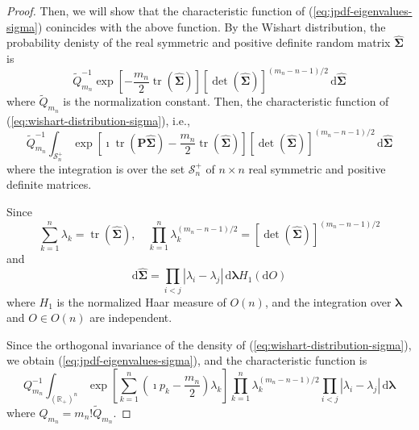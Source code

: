 \begin{proof}
    Then, we will show that the characteristic function of (\ref{eq:jpdf-eigenvalues-sigma}) conincides with the above function. By the Wishart distribution, the probability denisty of the real symmetric and positive definite random matrix $\widehat{\boldsymbol{\Sigma}}$ is
    \begin{equation}
        \widetilde{Q}_{m_{n}}^{-1}\exp\left[-\frac{m_{n}}{2}\operatorname{tr}\left(\widehat{\boldsymbol{\Sigma}}\right)\right]\left[\operatorname{det}\left(\widehat{\boldsymbol{\Sigma}}\right)\right]^{(m_{n}-n-1)/2}\,\mathrm{d}\widehat{\boldsymbol{\Sigma}}
        \label{eq:wishart-distribution-sigma}
    \end{equation}
    where $\widetilde{Q}_{m_{n}}$ is the normalization constant. Then, the characteristic function of (\ref{eq:wishart-distribution-sigma}), i.e.,
    \begin{equation*}
        \widetilde{Q}_{m_{n}}^{-1}\int_{\mathcal{S}_{n}^{+}}\exp\left[\imath\operatorname{tr}\left(\mathbf{P}\widehat{\boldsymbol{\Sigma}}\right)-\frac{m_{n}}{2}\operatorname{tr}\left(\widehat{\boldsymbol{\Sigma}}\right)\right]\left[\operatorname{det}\left(\widehat{\boldsymbol{\Sigma}}\right)\right]^{(m_{n}-n-1)/2}\,\mathrm{d}\widehat{\boldsymbol{\Sigma}}
    \end{equation*}
    where the integration is over the set $\mathcal{S}_{n}^{+}$ of $n\times n$ real symmetric and positive definite matrices.

    Since
    \begin{equation*}
        \sum_{k=1}^{n}\lambda_{k}=\operatorname{tr}\left(\widehat{\boldsymbol{\Sigma}}\right),\quad\prod_{k=1}^{n}\lambda_{k}^{(m_{n}-n-1)/2}=\left[\operatorname{det}\left(\widehat{\boldsymbol{\Sigma}}\right)\right]^{(m_{n}-n-1)/2}
    \end{equation*}
    and
    \begin{equation*}
        \mathrm{d}\widehat{\boldsymbol{\Sigma}}=\prod_{i<j}\left|\lambda_{i}-\lambda_{j}\right|\,\mathrm{d}\boldsymbol{\lambda}H_{1}\left(\mathrm{d}O\right)
    \end{equation*}
    where $H_{1}$ is the normalized Haar measure of $O(n)$, and the integration over $\boldsymbol{\lambda}$ and $O\in O(n)$ are independent.

    Since the orthogonal invariance of the density of (\ref{eq:wishart-distribution-sigma}), we obtain (\ref{eq:jpdf-eigenvalues-sigma}), and the characteristic function is
    \begin{equation}
        Q_{m_{n}}^{-1}\int_{\left(\mathbb{R}_{+}\right)^{n}}\exp\left[\sum_{k=1}^{n}\left(\imath p_{k}-\frac{m_{n}}{2}\right)\lambda_{k}\right]\prod_{k=1}^{n}\lambda_{k}^{(m_{n}-n-1)/2}\prod_{i<j}\left|\lambda_{i}-\lambda_{j}\right|\,\mathrm{d}\boldsymbol{\lambda}
        \label{eq:characteristic-function-wishart}
    \end{equation}
    where $Q_{m_{n}}=m_{n}!\widetilde{Q}_{m_{n}}$.


\end{proof}
